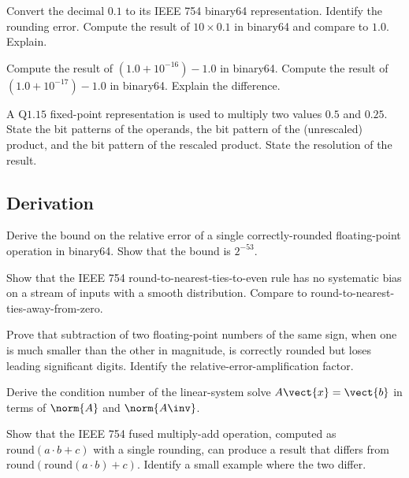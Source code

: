 \begin{exercise}
Convert the decimal $0.1$ to its IEEE 754 binary64 representation. Identify the rounding error. Compute the result of $10 \times 0.1$ in binary64 and compare to $1.0$. Explain.
\end{exercise}

\begin{exercise}
Compute the result of $(1.0 + 10^{-16}) - 1.0$ in binary64. Compute the result of $(1.0 + 10^{-17}) - 1.0$ in binary64. Explain the difference.
\end{exercise}

\begin{exercise}
A Q$1.15$ fixed-point representation is used to multiply two values $0.5$ and $0.25$. State the bit patterns of the operands, the bit pattern of the (unrescaled) product, and the bit pattern of the rescaled product. State the resolution of the result.
\end{exercise}

\subsection*{Derivation}

\begin{exercise}
Derive the bound on the relative error of a single correctly-rounded floating-point operation in binary64. Show that the bound is $2^{-53}$.
\end{exercise}

\begin{exercise}
Show that the IEEE 754 round-to-nearest-ties-to-even rule has no systematic bias on a stream of inputs with a smooth distribution. Compare to round-to-nearest-ties-away-from-zero.
\end{exercise}

\begin{exercise}
Prove that subtraction of two floating-point numbers of the same sign, when one is much smaller than the other in magnitude, is correctly rounded but loses leading significant digits. Identify the relative-error-amplification factor.
\end{exercise}

\begin{exercise}
Derive the condition number of the linear-system solve $A \vect{x} = \vect{b}$ in terms of $\norm{A}$ and $\norm{A\inv}$.
\end{exercise}

\begin{exercise}
Show that the IEEE 754 fused multiply-add operation, computed as $\mathrm{round}(a \cdot b + c)$ with a single rounding, can produce a result that differs from $\mathrm{round}(\mathrm{round}(a \cdot b) + c)$. Identify a small example where the two differ.
\end{exercise}

